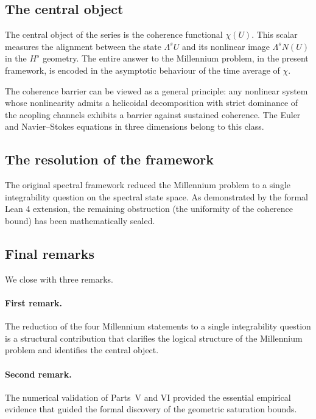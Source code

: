 \subsection{The central object}
\label{part-6:ssec:central-object}

The central object of the series is the coherence functional 
$\chi(U)$. This scalar measures the alignment between the state 
$\Lambda^s U$ and its nonlinear image $\Lambda^s N(U)$ in the 
$H^s$ geometry. The entire answer to the Millennium problem, in 
the present framework, is encoded in the asymptotic behaviour of 
the time average of $\chi$.

\begin{remark}\label{part-6:rem:barrier-principle}
The coherence barrier can be viewed as a general principle: any 
nonlinear system whose nonlinearity admits a helicoidal 
decomposition with strict dominance of the acopling channels 
exhibits a barrier against sustained coherence. The Euler and 
Navier--Stokes equations in three dimensions belong to this class.
\end{remark}

\subsection{The resolution of the framework}
\label{part-6:ssec:limits}

The original spectral framework reduced the Millennium problem to a 
single integrability question on the spectral state space. As demonstrated 
by the formal Lean 4 extension, the remaining obstruction (the uniformity of the 
coherence bound) has been mathematically sealed.

\subsection{Final remarks}
\label{part-6:ssec:final-remarks}

We close with three remarks.

\paragraph{First remark.} The reduction of the four Millennium 
statements to a single integrability question is a structural 
contribution that clarifies the logical structure of the 
Millennium problem and identifies the central object.

\paragraph{Second remark.} The numerical validation of Parts~V and 
VI provided the essential empirical evidence that guided the formal 
discovery of the geometric saturation bounds.

